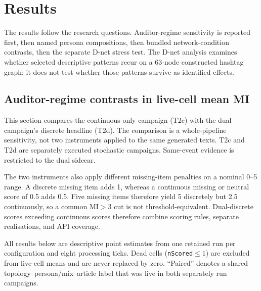 \chapter{Results}
\label{chap:results}
\sloppy

The results follow the research questions. Auditor-regime sensitivity is reported first, then named persona compositions, then bundled network-condition contrasts, then the separate D-net stress test. The D-net analysis examines whether selected descriptive patterns recur on a 63-node constructed hashtag graph; it does not test whether those patterns survive as identified effects.


\section{Auditor-regime contrasts in live-cell mean MI}
\label{sec:results-mpr}

This section compares the continuous-only campaign (T2c) with the dual
campaign's discrete headline (T2d). The comparison is a whole-pipeline
sensitivity, not two instruments applied to the same generated texts.
T2c and T2d are separately executed stochastic campaigns. Same-event
evidence is restricted to the dual sidecar.

The two instruments also apply different missing-item penalties on a
nominal 0--5 range. A discrete missing item adds 1, whereas a continuous
missing or neutral score of 0.5 adds 0.5. Five missing items therefore
yield 5 discretely but 2.5 continuously, so a common $\mathrm{MI}>3$ cut
is not threshold-equivalent. Dual-discrete scores exceeding continuous
scores therefore combine scoring rules, separate realisations, and API
coverage.

All results below are descriptive point estimates from one retained run
per configuration and eight processing ticks. Dead cells (\texttt{nScored}$\leq 1$)
are excluded from live-cell means and are never replaced by zero.
``Paired'' denotes a shared topology--persona/mix--article label that was
live in both separately run campaigns.

